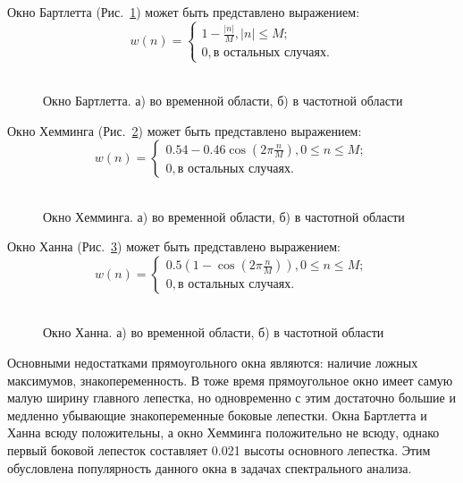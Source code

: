 Окно Бартлетта (\mbox{Рис. \ref{pic:win_bart}}) может быть представлено выражением:
\begin{equation}
	\label{eq:rect_bartlett}
	 w(n) = \begin{cases}
		1 - \frac{|n|}{M}, |n| \le M; \\
		0, \mbox{в остальных случаях}.
		\end{cases}
\end{equation}
\begin{figure}[h]
	\center{}
	\caption{\\Окно Бартлетта. а) во временной области, б) в частотной области}
	\label{pic:win_bart}
\end{figure}

Окно Хемминга (\mbox{Рис. \ref{pic:win_hamming}}) может быть представлено выражением:
\begin{equation}
	\label{eq:rect_hamming}
	 w(n) = \begin{cases}
		0.54 - 0.46\cos \left( 2 \pi \frac{n}{M} \right), 0 \le n \le M; \\
		0, \mbox{в остальных случаях}.
		\end{cases}
\end{equation}
\begin{figure}[h]
	\center{}
	\caption{\\Окно Хемминга. а) во временной области, б) в частотной области}
	\label{pic:win_hamming}
\end{figure}

Окно Ханна (\mbox{Рис. \ref{pic:win_hann}}) может быть представлено выражением:
\begin{equation}
	\label{eq:rect_hann}
	 w(n) = \begin{cases}
		0.5 \left( 1 - \cos\left( 2 \pi \frac{n}{M} \right) \right), 0 \le n \le M; \\
		0, \mbox{в остальных случаях}.
		\end{cases}
\end{equation}
\begin{figure}[h]
	\center{}
	\caption{\\Окно Ханна. а) во временной области, б) в частотной области}
	\label{pic:win_hann}
\end{figure}

Основными недостатками прямоугольного окна являются: наличие ложных максимумов, знакопеременность. В тоже время прямоугольное окно имеет самую малую ширину главного лепестка, но
одновременно с этим достаточно большие и медленно убывающие знакопеременные боковые лепестки. Окна Бартлетта и Ханна всюду положительны, а окно Хемминга положительно не всюду, однако
первый боковой лепесток составляет 0.021 высоты основного лепестка. Этим обусловлена популярность данного окна в задачах спектрального анализа.

